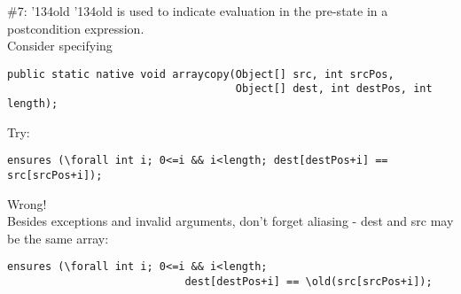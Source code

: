 \documentclass[
pdf,
nocolorBG,
slideColor,
cok,
]{prosper}
\newcommand{\bsl}{\char'134}
\newcommand{\old}{\bsl old}
\begin{document}

\begin{slide}{\#7: \old}
\vspace*{-6ex}
{\knalblue \old} is used to indicate evaluation in the pre-state in a postcondition expression.\\
\vspace{1ex}
Consider specifying
{\tiny
\begin{verbatim} 
public static native void arraycopy(Object[] src, int srcPos,
                                    Object[] dest, int destPos, int length);
\end{verbatim}
}
Try:
{\tiny
\begin{verbatim} 
ensures (\forall int i; 0<=i && i<length; dest[destPos+i] == src[srcPos+i]);
\end{verbatim}
}

{\red
Wrong!}\\
\vspace{1ex}
Besides exceptions and invalid arguments, don't forget aliasing - {\blue dest} and {\blue src} may be the same array:
{\tiny
\begin{verbatim} 
ensures (\forall int i; 0<=i && i<length; 
                            dest[destPos+i] == \old(src[srcPos+i]);
\end{verbatim}
}

\end{slide}


\end{document}
